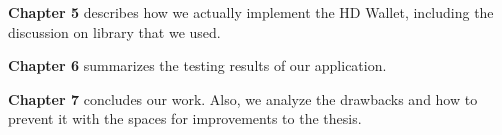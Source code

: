 \textbf{Chapter 5} describes how we actually implement the HD Wallet, including the discussion on library that we used.

\textbf{Chapter 6} summarizes the testing results of our application.

\textbf{Chapter 7} concludes our work. Also, we analyze the drawbacks and how to prevent it with the spaces for improvements to the thesis.










